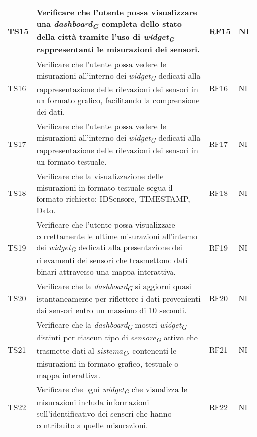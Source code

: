 \begin{longtable}{|C{1.9cm}|L{5cm}|C{2cm}|C{2cm}|}
    TS15 & Verificare che l'utente possa visualizzare una \textit{dashboard}\textsubscript{\textit{G}} completa dello stato della città tramite l'uso di \textit{widget}\textsubscript{\textit{G}} rappresentanti le misurazioni dei sensori. & RF15 & NI \\
    \hline

    TS16 & Verificare che l'utente possa vedere le misurazioni all'interno dei \textit{widget}\textsubscript{\textit{G}} dedicati alla rappresentazione delle rilevazioni dei sensori in un formato grafico, facilitando la comprensione dei dati. & RF16 & NI \\
    \hline

    TS17 & Verificare che l'utente possa vedere le misurazioni all'interno dei \textit{widget}\textsubscript{\textit{G}} dedicati alla rappresentazione delle rilevazioni dei sensori in un formato testuale. & RF17 & NI \\
    \hline

    TS18 & Verificare che la visualizzazione delle misurazioni in formato testuale segua il formato richiesto: IDSensore, TIMESTAMP, Dato. & RF18 & NI \\
    \hline

    TS19 & Verificare che l'utente possa visualizzare correttamente le ultime misurazioni all'interno dei \textit{widget}\textsubscript{\textit{G}} dedicati alla presentazione dei rilevamenti dei sensori che trasmettono dati binari attraverso una mappa interattiva. & RF19 & NI \\
    \hline

    TS20 & Verificare che la \textit{dashboard}\textsubscript{\textit{G}} si aggiorni quasi istantaneamente per riflettere i dati provenienti dai sensori entro un massimo di 10 secondi. & RF20 & NI \\
    \hline

    TS21 & Verificare che la \textit{dashboard}\textsubscript{\textit{G}} mostri \textit{widget}\textsubscript{\textit{G}} distinti per ciascun tipo di \textit{sensore}\textsubscript{\textit{G}} attivo che trasmette dati al \textit{sistema}\textsubscript{\textit{G}}, contenenti le misurazioni in formato grafico, testuale o mappa interattiva. & RF21 & NI \\
    \hline

    TS22 & Verificare che ogni \textit{widget}\textsubscript{\textit{G}} che visualizza le misurazioni includa informazioni sull'identificativo dei sensori che hanno contribuito a quelle misurazioni. & RF22 & NI \\
    \hline


\end{longtable}
